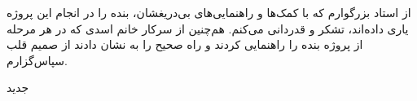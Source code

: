 


\begin{center}
\end{center}

از استاد بزرگوارم که با کمک‌ها و راهنمایی‌های بی‌دریغشان، بنده را در انجام این پروژه یاری داده‌اند، تشکر و قدردانی می‌کنم.
هم‌چنین از سرکار خانم اسدی که در هر مرحله از پروژه بنده را راهنمایی کردند و راه صحیح را به نشان دادند از صمیم قلب سپاس‌گزارم. 

‌جدید
